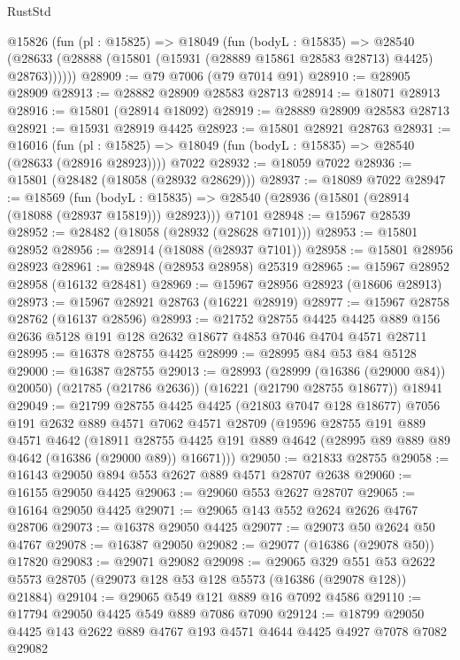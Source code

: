 \begin{lexlean}{RustStd}
\begin{coremodule}
    @15826
      (fun (pl : @15825) =>
      @18049
        (fun (bodyL : @15835) =>
        @28540 (@28633 (@28888 (@15801 (@15931 (@28889 @15861 @28583 @28713) @4425) @28763))))))
@28909 := @79 @7006 (@79 @7014 @91)
@28910 := @28905 @28909
@28913 := @28882 @28909 @28583 @28713
@28914 := @18071 @28913
@28916 := @15801 (@28914 @18092)
@28919 := @28889 @28909 @28583 @28713
@28921 := @15931 @28919 @4425
@28923 := @15801 @28921 @28763
@28931 := @16016
    (fun (pl : @15825) => @18049 (fun (bodyL : @15835) => @28540 (@28633 (@28916 @28923))))
    @7022
@28932 := @18059 @7022
@28936 := @15801 (@28482 (@18058 (@28932 @28629)))
@28937 := @18089 @7022
@28947 := @18569
    (fun (bodyL : @15835) => @28540 (@28936 (@15801 (@28914 (@18088 (@28937 @15819))) @28923)))
    @7101
@28948 := @15967 @28539
@28952 := @28482 (@18058 (@28932 (@28628 @7101)))
@28953 := @15801 @28952
@28956 := @28914 (@18088 (@28937 @7101))
@28958 := @15801 @28956 @28923
@28961 := @28948 (@28953 @28958) @25319
@28965 := @15967 @28952 @28958 (@16132 @28481)
@28969 := @15967 @28956 @28923 (@18606 @28913)
@28973 := @15967 @28921 @28763 (@16221 @28919)
@28977 := @15967 @28758 @28762 (@16137 @28596)
@28993 := @21752
    @28755
    @4425
    @4425
    @889
    @156
    @2636
    @5128
    @191
    @128
    @2632
    @18677
    @4853
    @7046
    @4704
    @4571
    @28711
@28995 := @16378 @28755 @4425
@28999 := @28995 @84 @53 @84 @5128
@29000 := @16387 @28755
@29013 := @28993
    (@28999 (@16386 (@29000 @84)) @20050)
    (@21785 (@21786 @2636))
    (@16221 (@21790 @28755 @18677))
    @18941
@29049 := @21799
    @28755
    @4425
    @4425
    (@21803 @7047 @128 @18677)
    @7056
    @191
    @2632
    @889
    @4571
    @7062
    @4571
    @28709
    (@19596
      @28755
      @191
      @889
      @4571
      @4642
      (@18911
        @28755
        @4425
        @191
        @889
        @4642
        (@28995 @89 @889 @89 @4642 (@16386 (@29000 @89)) @16671)))
@29050 := @21833 @28755
@29058 := @16143 @29050 @894 @553 @2627 @889 @4571 @28707 @2638
@29060 := @16155 @29050 @4425
@29063 := @29060 @553 @2627 @28707
@29065 := @16164 @29050 @4425
@29071 := @29065 @143 @552 @2624 @2626 @4767 @28706
@29073 := @16378 @29050 @4425
@29077 := @29073 @50 @2624 @50 @4767
@29078 := @16387 @29050
@29082 := @29077 (@16386 (@29078 @50)) @17820
@29083 := @29071 @29082
@29098 := @29065
    @329
    @551
    @53
    @2622
    @5573
    @28705
    (@29073 @128 @53 @128 @5573 (@16386 (@29078 @128)) @21884)
@29104 := @29065 @549 @121 @889 @16 @7092 @4586
@29110 := @17794 @29050 @4425 @549 @889 @7086 @7090
@29124 := @18799 @29050 @4425 @143 @2622 @889 @4767 @193 @4571 @4644 @4425 @4927 @7078 @7082 @29082

\end{coremodule}
\end{lexlean}
